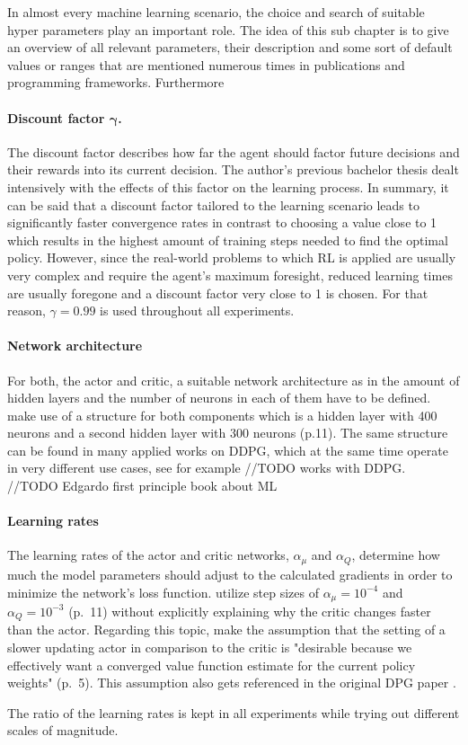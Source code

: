 In almost every machine learning scenario, the choice and search of suitable hyper parameters play an important role. The idea of this sub chapter is to give an overview of all relevant parameters, their description and some sort of default values or ranges that are mentioned numerous times in publications and programming frameworks. Furthermore 
\par
\paragraph{Discount factor $\boldsymbol{\gamma}$.} The discount factor describes how far the agent should factor future decisions and their rewards into its current decision. The author's previous bachelor thesis dealt intensively with the effects of this factor on the learning process. In summary, it can be said that a discount factor tailored to the learning scenario leads to significantly faster convergence rates in contrast to choosing a value close to 1 which results in the highest amount of training steps needed to find the optimal policy. However, since the real-world problems to which RL is applied are usually very complex and require the agent's maximum foresight, reduced learning times are usually foregone and a discount factor very close to 1 is chosen. For that reason, $\gamma = 0.99$ is used throughout all experiments.

\paragraph{Network architecture} For both, the actor and critic, a suitable network architecture as in the amount of hidden layers and the number of neurons in each of them have to be defined. \cite{lillicrap2019continuous} make use of a structure for both components which is a hidden layer with 400 neurons and a second hidden layer with 300 neurons (p.11). The same structure can be found in many applied works on DDPG, which at the same time operate in very different use cases, see for example //TODO works with DDPG.
//TODO Edgardo first principle book about ML

\paragraph{Learning rates} The learning rates of the actor and critic networks, $\alpha_\mu$ and $\alpha_Q$, determine
how much the model parameters should adjust to the calculated gradients in order to minimize the network's loss function. \cite{lillicrap2019continuous} utilize step sizes of $\alpha_\mu = 10^{-4}$ and $\alpha_Q = 10^{-3}$ (p.~11) without explicitly explaining why the critic changes faster than the actor. Regarding this topic, \cite{degris2012off} make the assumption that the setting of a slower updating actor in comparison to the critic is "desirable because we  effectively want
a converged value function estimate for the current
policy weights" (p.~5). This assumption also gets referenced in the original DPG paper \cite[p.~6]{silver2014deterministic}.
\par 
The ratio of the learning rates is kept in all experiments while trying out different scales of magnitude.

